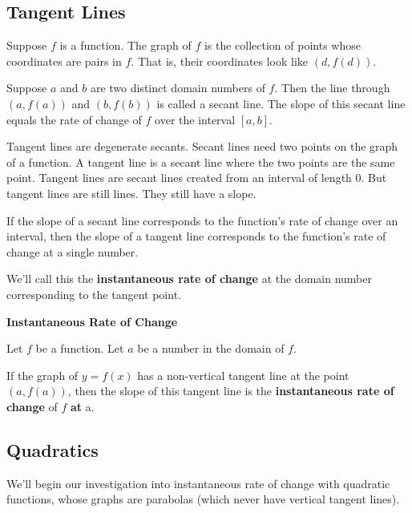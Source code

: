 \documentclass{ximera}
\begin{document}
\subsection{Tangent Lines}

Suppose $f$ is a function.  The graph of $f$ is the collection of points whose coordinates are pairs in $f$.  That is, their coordinates look like $(d, f(d))$.

Suppose $a$ and $b$ are two distinct domain numbers of $f$.  Then the line through $(a, f(a))$ and $(b, f(b))$ is called a secant line.  The slope of this secant line equals the rate of change of $f$ over the interval $[a, b]$.

Tangent lines are degenerate secants. Secant lines need two points on the graph of a function.  A tangent line is a secant line where the two points are the same point. Tangent lines are secant lines created from an interval of length $0$.  But tangent lines are still lines.  They still have a slope.


If the slope of a secant line corresponds to the function's rate of change over an interval, then the slope of a tangent line corresponds to the function's rate of change at a single number.


We'll call this the \textbf{\textcolor{purple!85!blue}{instantaneous rate of change}} at the domain number corresponding to the tangent point.




\begin{definition} \textbf{\textcolor{green!50!black}{Instantaneous Rate of Change}}  


Let $f$ be a function. Let $a$ be a number in the domain of $f$.

If the graph of $y = f(x)$ has a non-vertical tangent line at the point $(a, f(a))$, then the slope of this tangent line is the \textbf{instantaneous rate of change} of $f$ \textbf{at} a.


\end{definition}














\subsection{Quadratics}

We'll begin our investigation into instantaneous rate of change with quadratic functions, whose graphs are parabolas (which never have vertical tangent lines). \\
\end{document}
